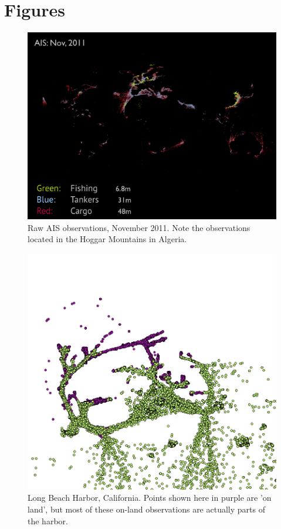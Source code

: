 \appendix{}
\gdef\thesection{Appendix \Alph{section}}

\section{Figures}
\label{sec:figures}

\begin{figure}[htbp]
  \centering
  \includegraphics[width=160mm]{figures/ais-nov-2011.pdf}
  \caption{Raw AIS observations, November 2011. Note the observations located in the Hoggar Mountains in Algeria.}
  \label{fig:ais-obs-nov-2011}
\end{figure}

\begin{figure}[htbp]
  \centering
  \includegraphics[width=140mm]{images/example-long-beach-harbor-validation.png}
  \caption{Long Beach Harbor, California. Points shown here in purple are 'on land', but most of these on-land observations are actually parts of the harbor.} %
  \label{fig:longbeach-validation}
\end{figure}


